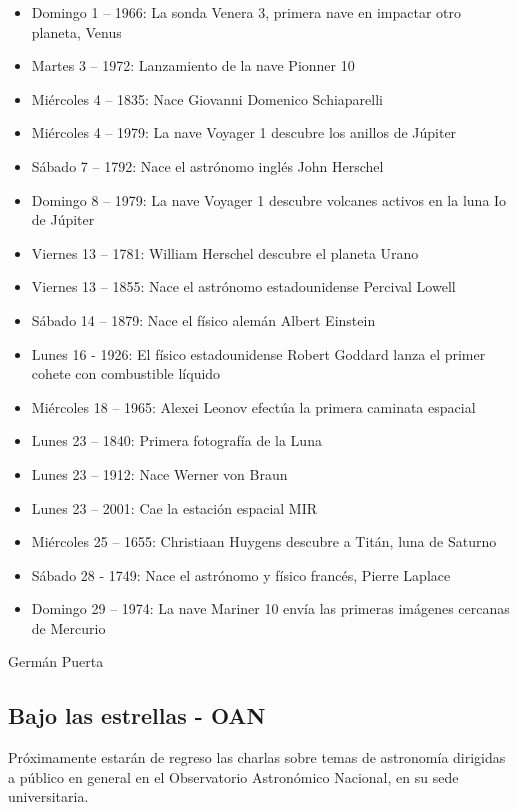 \documentclass{book}
\begin{document}
\begin{itemize}
  \item Domingo 1 – 1966: La sonda Venera 3, primera nave en impactar otro planeta, Venus                     
  \item Martes 3 – 1972: Lanzamiento de la nave Pionner 10
  \item Miércoles 4 – 1835: Nace Giovanni Domenico Schiaparelli
  \item Miércoles 4 – 1979: La nave Voyager 1 descubre los anillos de Júpiter
  \item Sábado 7 – 1792: Nace el astrónomo inglés John Herschel
  \item Domingo 8 – 1979: La nave Voyager 1 descubre volcanes activos en la luna Io de Júpiter
  \item Viernes 13 – 1781: William Herschel descubre el planeta Urano
  \item Viernes 13 – 1855: Nace el astrónomo estadounidense Percival Lowell
  \item Sábado 14 – 1879: Nace el físico alemán Albert Einstein
  \item Lunes 16 - 1926: El físico estadounidense Robert Goddard lanza el primer cohete con combustible líquido
  \item Miércoles 18 – 1965: Alexei Leonov efectúa la primera caminata espacial
  \item Lunes 23 – 1840: Primera fotografía de la Luna
  \item Lunes 23 – 1912: Nace Werner von Braun
  \item Lunes 23 – 2001: Cae la estación espacial MIR
  \item Miércoles 25 – 1655: Christiaan Huygens descubre a Titán, luna de Saturno
  \item Sábado 28 - 1749: Nace el astrónomo y físico francés, Pierre Laplace
  \item Domingo 29 – 1974: La nave Mariner 10 envía las primeras imágenes cercanas de Mercurio    
\end{itemize}

\begin{flushright}
Germán Puerta
\end{flushright}


\subsection{Bajo las estrellas - OAN}
Próximamente estarán de regreso las charlas sobre temas de astronomía dirigidas a público en general en el Observatorio Astronómico Nacional, en su sede universitaria.
\end{document}
